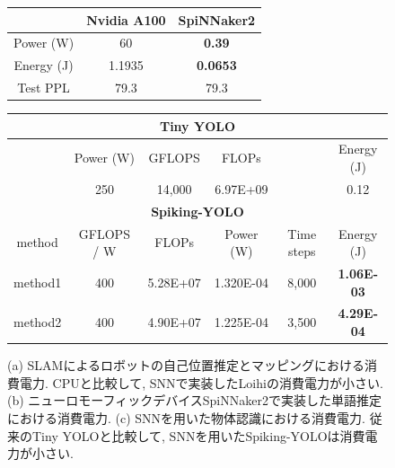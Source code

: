 \begin{figure}[htbp]
    \centering

    \begin{minipage}{0.3\textwidth}
        \centering
        
        \label{fig:snnslam}
    \end{minipage}
    \hspace{0.02\textwidth}
    \begin{minipage}{0.6\textwidth}
        \centering
        \begin{tabular}{ccc}
            \hline
            & Nvidia A100 & SpiNNaker2 \\ 
            \hline
            Power (W) & 60 & \textbf{0.39} \\
            Energy (J) & 1.1935 & \textbf{0.0653} \\
            Test PPL & 79.3 & 79.3 \\
            \hline
        \end{tabular}
        \label{tab:spinnaker}
    \end{minipage}


    \begin{minipage}{1.0\textwidth}
        \centering
        \begin{tabular}{cccccc}
            \hline
            \multicolumn{6}{c}{\textbf{Tiny YOLO}}\\
            \hline
            &Power (W) & GFLOPS & FLOPs & & Energy (J) \\
            &250 & 14,000 & 6.97E+09 & & 0.12 \\
            \hline
            \multicolumn{6}{c}{\textbf{Spiking-YOLO}}\\
            \hline
            method & GFLOPS / W & FLOPs & Power (W) & Time steps & Energy (J) \\
            method1 & 400 & 5.28E+07 & 1.320E-04 & 8,000 & \textbf{1.06E-03} \\
            method2 & 400 & 4.90E+07 & 1.225E-04 & 3,500 & \textbf{4.29E-04} \\
            \hline
        \end{tabular}
        \label{tab:snnyolo}
    \end{minipage}

    \caption[SNNの低消費電力性能]{
        (a) SLAMによるロボットの自己位置推定とマッピングにおける消費電力. 
        CPUと比較して, SNNで実装したLoihiの消費電力が小さい.
        (b) ニューロモーフィックデバイスSpiNNaker2で実装した単語推定における消費電力. 
        (c) SNNを用いた物体認識における消費電力. 従来のTiny YOLOと比較して, SNNを用いたSpiking-YOLOは消費電力が小さい.
    }
\end{figure}


